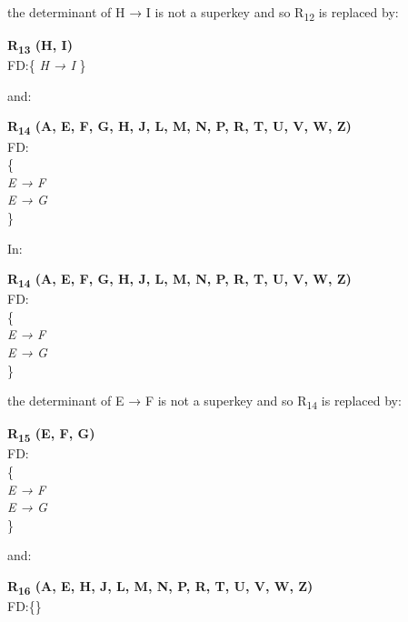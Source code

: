  




the determinant of H → I is not a superkey and so R\textsubscript{12} is replaced by:

\begin{adjustwidth}{2cm}{}
\textbf{R\textsubscript{13} (H, I)}\\
FD:\{
\textit{ 
H → I 
}
\} \\
\end{adjustwidth} 

and:\\

\begin{adjustwidth}{2cm}{}
\textbf{R\textsubscript{14} (A, E, F, G, H, J, L, M, N, P, R, T, U, V, W, Z)}\\
FD:\\
\{\\
\textit{ 
E → F\\
E → G\\
}
\} \\
\end{adjustwidth} 

In:\\

\begin{adjustwidth}{2cm}{}
\textbf{R\textsubscript{14} (A, E, F, G, H, J, L, M, N, P, R, T, U, V, W, Z)}\\
FD:\\
\{\\
\textit{ 
E → F\\
E → G\\
}
\} \\
\end{adjustwidth} 

the determinant of E → F is not a superkey and so R\textsubscript{14} is replaced by:

\begin{adjustwidth}{2cm}{}
\textbf{R\textsubscript{15} (E, F, G)}\\
FD:\\
\{\\
\textit{ 
E → F\\
E → G\\
}
\} \\
\end{adjustwidth}

and:\\

\begin{adjustwidth}{2cm}{}
\textbf{R\textsubscript{16} (A, E, H, J, L, M, N, P, R, T, U, V, W, Z)}\\
FD:\{\} \\ \\
\end{adjustwidth}

